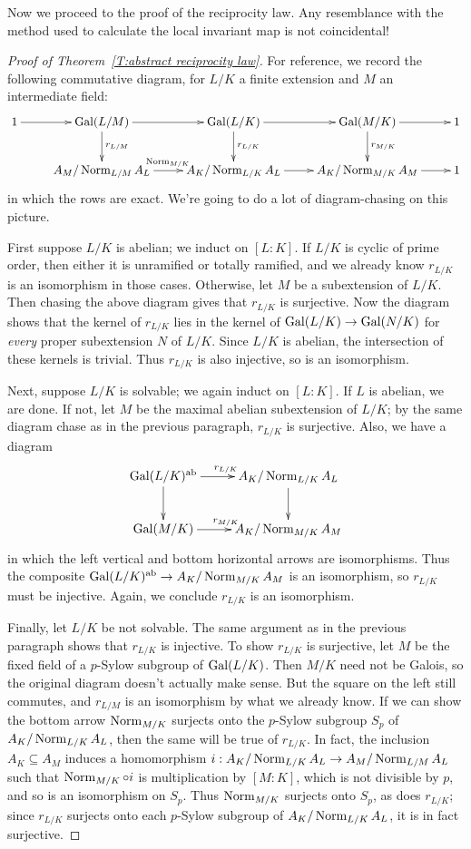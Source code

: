 Now we proceed to the proof of the reciprocity law. Any resemblance
with the method used to calculate the local invariant map is not
coincidental!
\begin{proof}[Proof of Theorem~\ref{T:abstract reciprocity law}]
For reference, we record the following commutative diagram, for $L/K$
a finite extension and $M$ an intermediate field:
\[
\xymatrix{
1 \ar[r] & \Gal(L/M) \ar[r] \ar^{r_{L/M}}[d] & \Gal(L/K)
\ar[r] \ar^{r_{L/K}}[d] & \Gal(M/K) \ar[r] \ar[d]^{r_{M/K}} & 1 \\
& A_M/\Norm_{L/M}A_L \ar^{\Norm_{M/K}}[r] & A_K/\Norm_{L/K} A_L \ar[r] &
A_K / \Norm_{M/K} A_M \ar[r] & 1
}
\]
in which the rows are exact. We're going to do a lot of diagram-chasing
on this picture. 

First suppose $L/K$ is abelian; we induct on $[L:K]$.
If $L/K$ is cyclic of prime order, 
then either it is unramified or totally ramified, and we already know
$r_{L/K}$ is an isomorphism in those cases. Otherwise, let $M$ be
a subextension of $L/K$. Then chasing the above diagram gives that
$r_{L/K}$ is surjective. Now the diagram shows that the kernel of $r_{L/K}$
lies in the kernel of $\operatorname{Gal}(L/K) \to \operatorname{Gal}(N/K)$ for \emph{every}
proper subextension $N$ of $L/K$. Since $L/K$ is abelian, the intersection
of these kernels is trivial. Thus $r_{L/K}$ is also injective, so is 
an isomorphism.

Next, suppose $L/K$ is solvable; we again induct on $[L:K]$.
If $L$ is abelian, we are done. If not, let $M$ be the maximal abelian
subextension of $L/K$; by the same diagram chase as in the
previous paragraph, $r_{L/K}$ is surjective.
Also, we have a diagram
\[
\xymatrix{
\Gal(L/K)^{\ab} \ar^{r_{L/K}}[r] \ar[d] & A_K / \Norm_{L/K} A_L \ar[d] \\
\Gal(M/K) \ar^{r_{M/K}}[r] & A_K / \Norm_{M/K} A_M
}
\]
in which the left vertical and bottom horizontal arrows are isomorphisms.
Thus the composite $\operatorname{Gal}(L/K)^{\operatorname{ab}} \to A_K / \operatorname{Norm}_{M/K} A_M$ is
an isomorphism, so $r_{L/K}$ must be injective. Again, we conclude
$r_{L/K}$ is an isomorphism.

Finally, let $L/K$ be not solvable. The same argument as in the previous
paragraph shows that $r_{L/K}$ is injective. To show $r_{L/K}$ is surjective,
let $M$ be the fixed field of a $p$-Sylow
subgroup of $\operatorname{Gal}(L/K)$. Then $M/K$ need not be Galois, so the original diagram
doesn't actually make sense. But the square on the left still commutes,
and $r_{L/M}$ is an isomorphism by what we already know. If we can show
the bottom arrow $\operatorname{Norm}_{M/K}$ surjects onto the $p$-Sylow subgroup
$S_p$ of $A_K/\operatorname{Norm}_{L/K}A_L$, then the same will be true of $r_{L/K}$. In fact,
the inclusion $A_K \subseteq A_M$ induces a homomorphism
$i: A_K/\operatorname{Norm}_{L/K}A_L \to A_M /\operatorname{Norm}_{L/M} A_L$ such that
$\operatorname{Norm}_{M/K} \circ i$ is multiplication by $[M:K]$, which is not divisible
by $p$, and so is an isomorphism on $S_p$. Thus $\operatorname{Norm}_{M/K}$ surjects onto
$S_p$, as does $r_{L/K}$; since $r_{L/K}$ surjects onto each $p$-Sylow
subgroup of $A_K/\operatorname{Norm}_{L/K}A_L$, it is in fact surjective.
\end{proof}

